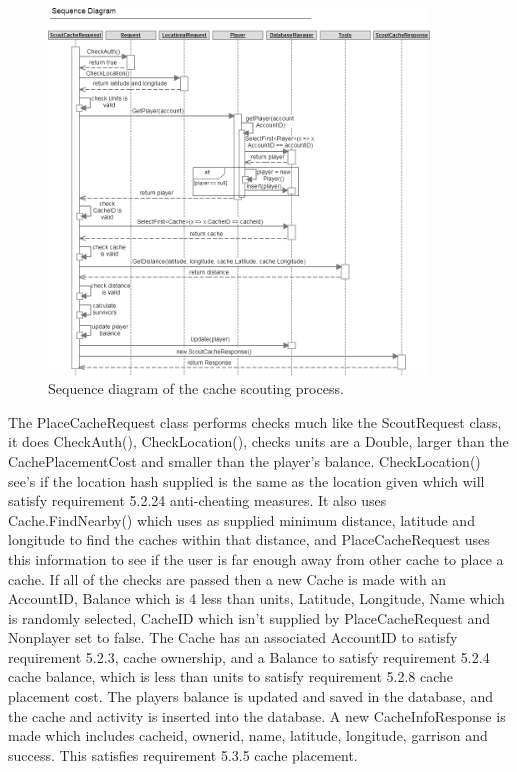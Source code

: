 \begin{figure}
    \centering
    \includegraphics[width=0.9\textwidth]{images/sequence/scoutCache}
    \caption{Sequence diagram of the cache scouting process.}
\end{figure}

The PlaceCacheRequest class performs checks much like the ScoutRequest class, it does CheckAuth(), CheckLocation(), checks units are a Double, larger than the CachePlacementCost and smaller than the player's balance. CheckLocation() see's if the location hash supplied is the same as the location given which will satisfy requirement 5.2.24 anti-cheating measures. It also uses Cache.FindNearby() which uses as supplied minimum distance, latitude and longitude to find the caches within that distance, and PlaceCacheRequest uses this information to see if the user is far enough away from other cache to place a cache. If all of the checks are passed then a new Cache is made with an AccountID, Balance which is 4 less than units, Latitude, Longitude, Name which is randomly selected, CacheID which isn't supplied by PlaceCacheRequest and Nonplayer set to false. The Cache has an associated AccountID to satisfy requirement 5.2.3, cache ownership, and a Balance to satisfy requirement 5.2.4 cache balance, which is less than units to satisfy requirement 5.2.8 cache placement cost. The players balance is updated and saved in the database, and the cache and activity is inserted into the database. A new CacheInfoResponse is made which includes cacheid, ownerid, name, latitude, longitude, garrison and success. This satisfies requirement 5.3.5 cache placement.

